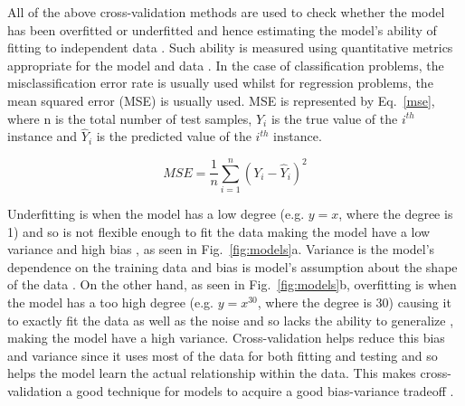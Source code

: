 All of the above cross-validation methods are used to check whether the model has been overfitted or underfitted and hence estimating the model's ability of fitting to independent data . Such ability is measured using quantitative metrics appropriate for the model and data \cite[-3\baselineskip]{kohavi1995study, arlot2010survey}. In the case of classification problems, the misclassification error rate is usually used whilst for regression problems, the mean squared error (MSE) is usually used. MSE is represented by Eq.~\ref{mse}, where n is the total number of test samples, $Y_i$ is the true value of the $i^{th}$ instance and $\hat{Y}_i$ is the predicted value of the $i^{th}$ instance.

\begin{equation}\label{mse}
MSE = \frac{1}{n}\sum^{n}_{i=1}(Y_i - \hat{Y}_i)^2
\end{equation}

Underfitting  is when the model has a low degree (e.g. $y = x$, where the degree is 1) and so is not flexible enough to fit the data making the model have a low variance and high bias \cite{baumann2003cross}, as seen in Fig.~\ref{fig:models}a. Variance is the model's dependence on the training data and bias is model's assumption about the shape of the data \cite{arlot2010survey}. On the other hand, as seen in Fig.~\ref{fig:models}b, overfitting  is when the model has a too high degree (e.g. $y = x^{30}$, where the degree is 30) causing it to exactly fit the data as well as the noise and so lacks the ability to generalize \cite{baumann2003cross}, making the model have a high variance. Cross-validation helps reduce this bias and variance since it uses most of the data for both fitting and testing and so helps the model learn the actual relationship within the data. This makes cross-validation a good technique for models to acquire a good bias-variance tradeoff \cite{arlot2010survey}.

